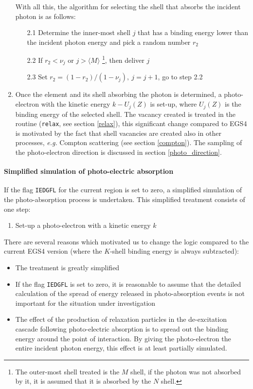 \begin{enumerate}
With all this, the algorithm for selecting the shell that absorbs
the incident photon is as follows:
\begin{itemize}
\item[2.1]
Determine the inner-most shell $j$ that has a binding energy lower
than the incident photon energy and pick a random number $r_2$
\item[2.2]
If $r_2 < \nu_j$ or $j > \langle M \rangle$
\footnote{The outer-most shell treated is the $M$ shell, if the photon
was not absorbed by it, it is assumed that it is absorbed by the
$N$ shell.}, then deliver $j$
\item[2.3]
Set $r_2 = (1 - r_2)/(1 - \nu_j),~j = j+1$, go to step 2.2
\end{itemize}
\item
Once the element and its shell absorbing the photon is determined,
a photo-electron with the kinetic energy $k - U_j(Z)$ is set-up, where
$U_j(Z)$ is the binding energy of the selected shell.
The vacancy created is treated in the routine ({\tt relax}, see section
\ref{relax}),
this significant change compared to EGS4 is motivated by the
fact that shell vacancies are created also
in other processes, {\em e.g.} Compton scattering (see section \ref{compton}).
The sampling of the photo-electron direction is discussed in section
\ref{photo_direction}.
\end{enumerate}

\paragraph{Simplified simulation of photo-electric absorption}\hfill
\label{photo_simple}

If the flag {\tt IEDGFL} for the current region is set to zero,
a simplified simulation of the photo-absorption process is undertaken.
This simplified treatment consists of one step:
\begin{enumerate}
\item
Set-up a photo-electron with a kinetic energy $k$
\end{enumerate}
There are several reasons which motivated us to change the
logic compared to the current EGS4 version (where the
$K$-shell binding energy is always subtracted):
\begin{itemize}
\item
The treatment is greatly simplified
\item
If the flag {\tt IEDGFL} is set to zero, it is reasonable to assume
that the detailed calculation of the spread of energy released
in photo-absorption events is not important for the situation
under investigation
\item
The effect of the production of relaxation particles in the
de-excitation cascade following photo-electric absorption is
to spread out the binding energy around the point of interaction.
By giving the photo-electron the entire incident photon energy,
this effect is at least partially simulated.
\end{itemize}


